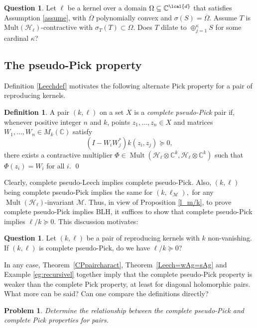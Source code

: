 \documentclass[a4paper,reqno,index]{amsart}
\numberwithin{equation}{section}
\newtheorem{problem}[theorem]{Problem}
\newcommand{\CC}{\mathbb{C}}
\newcommand{\Mult}{\operatorname{Mult}}
\newcommand{\specT}{\sigma_T}  %
\newcommand{\ol}[1]{\overline{#1}}
\newcommand{\opphi}[4]{{#1}\in \Mult({#3},{#4})}
\theoremstyle{definition}
\newtheorem{definition}[theorem]{Definition}
\newtheorem{question}[theorem]{Question}
\begin{document}
\begin{question}
Let $\ell$ be a kernel over a domain $\Omega\subseteq\CC^{\lcal{d}}$ that satisfies Assumption \ref{assume}, with $\ol{\Omega}$ polynomially convex and $\sigma(S)=\ol{\Omega}$. Assume $T$ is $\text{Mult}(\mathcal{H}_{\ell})$-contractive with $\specT(T)\subset\Omega.$ Does  $T$ dilate to
 $\oplus_{j=1}^\kappa S$ for some cardinal $\kappa$?
\end{question}

 
\subsection{The pseudo-Pick property}

Definition \ref{Leechdef} motivates the following alternate Pick property for a pair of reproducing kernels.



 
\begin{definition}
A pair $(k, \ell)$ on a set $X$ is a \textit{complete pseudo-Pick} pair if, whenever  positive integer  $n$ and $k$, points  $z_1, \dots, z_n\in X$ and  matrices $W_1, \dots, W_n\in M_k(\CC)$ satisfy
\[(I-W_iW_j^*)k(z_i, z_j)\succeq 0, \]
there exists a contractive multiplier $\opphi{\Phi}{X}{ \mathcal{H}_{\ell}\otimes\CC^k}{\mathcal{H}_{\ell}\otimes\CC^k}$ such that $\Phi(z_i)=W_i$ for all $i$.
\qed\end{definition}
Clearly, complete pseudo-Leech implies complete pseudo-Pick. Also, $(k, \ell)$ being complete pseudo-Pick implies the same for $(k, \ell_{\mathcal{M}}),$ for any $\Mult(\mathcal{H}_{\ell})$-invariant $\mathcal{M}.$ Thus, in view of Proposition \ref{l_m/k}, to prove complete pseudo-Pick implies BLH, it suffices to show that complete pseudo-Pick implies $\ell/k\succeq 0$. This discussion motivates:

\begin{question}\label{q:pseudo-Pick}
    Let $(k, \ell)$ be a pair of reproducing kernels with $k$ non-vanishing. If $(k, \ell)$ is complete pseudo-Pick, do we have $\ell/k\succeq 0$?  
\end{question}
 \noindent 

 
In any case, 
Theorem~\ref{CPpaircharact}, Theorem~\ref{Leech=wAg=sAg} and Example \ref{eg:recursivel} together imply that  the complete pseudo-Pick property is weaker than the complete Pick property, at least for diagonal holomorphic pairs. What more can be said? Can one compare the definitions directly?

\begin{problem}
    Determine the relationship between the complete pseudo-Pick
    and complete Pick properties for pairs.
\end{problem}
 
\end{document}
